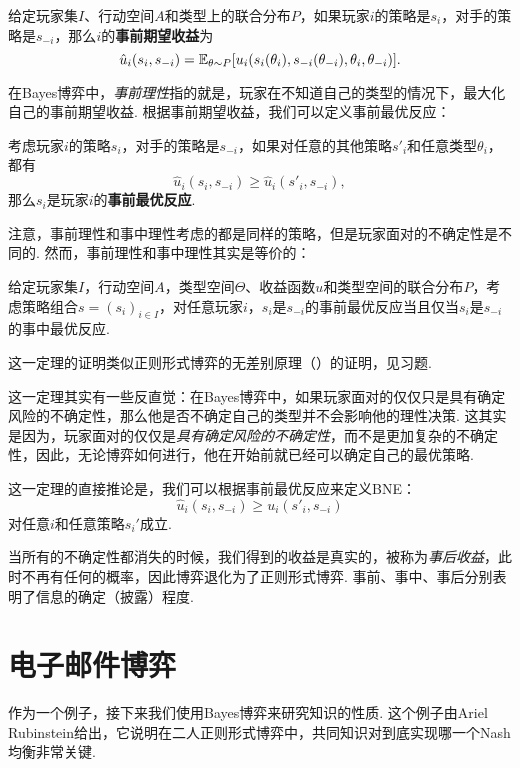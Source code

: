 \begin{definition}[事前期望收益]
    给定玩家集$I$、行动空间$A$和类型上的联合分布$P$，如果玩家$i$的策略是$s_i$，对手的策略是$s_{-i}$，那么$i$的\textbf{事前期望收益}为
\[\hat u_i(s_i,s_{-i})=\mathbb{E}_{\theta\sim P}[u_i(s_i(\theta_i),s_{-i}(\theta_{-i}),\theta_i,\theta_{-i})].\]
\end{definition}

在Bayes博弈中，\textit{事前理性}指的就是，玩家在不知道自己的类型的情况下，最大化自己的事前期望收益. 根据事前期望收益，我们可以定义事前最优反应：

\begin{definition}[事前最优反应]
    考虑玩家$i$的策略$s_i$，对手的策略是$s_{-i}$，如果对任意的其他策略$s'_i$和任意类型$\theta_i$，都有
    \[\hat u_i(s_i,s_{-i})\geq \hat u_i(s'_i,s_{-i}),\]
    那么$s_i$是玩家$i$的\textbf{事前最优反应}.
\end{definition}

注意，事前理性和事中理性考虑的都是同样的策略，但是玩家面对的不确定性是不同的. 然而，事前理性和事中理性其实是等价的：

\begin{theorem}
    给定玩家集$I，$行动空间$A$，类型空间$\Theta$、收益函数$u$和类型空间的联合分布$P$，考虑策略组合$s=(s_i)_{i\in I}$，对任意玩家$i$，$s_i$是$s_{-i}$的事前最优反应当且仅当$s_i$是$s_{-i}$的事中最优反应.
\end{theorem}
这一定理的证明类似正则形式博弈的无差别原理（）的证明，见习题.

这一定理其实有一些反直觉：在Bayes博弈中，如果玩家面对的仅仅只是具有确定风险的不确定性，那么他是否不确定自己的类型并不会影响他的理性决策. 这其实是因为，玩家面对的仅仅是\textit{具有确定风险的不确定性}，而不是更加复杂的不确定性，因此，无论博弈如何进行，他在开始前就已经可以确定自己的最优策略.

这一定理的直接推论是，我们可以根据事前最优反应来定义BNE：
     \[\hat u_i(s_i,s_{-i})\geq u_i(s'_i,s_{-i})\]
对任意$i$和任意策略$s_i'$成立.

当所有的不确定性都消失的时候，我们得到的收益是真实的，被称为\textit{事后收益}，此时不再有任何的概率，因此博弈退化为了正则形式博弈. 事前、事中、事后分别表明了信息的确定（披露）程度. 

\section{电子邮件博弈}\label{sec:emailing-game}

作为一个例子，接下来我们使用Bayes博弈来研究知识的性质. 这个例子由Ariel Rubinstein给出，它说明在二人正则形式博弈中，共同知识对到底实现哪一个Nash均衡非常关键.

